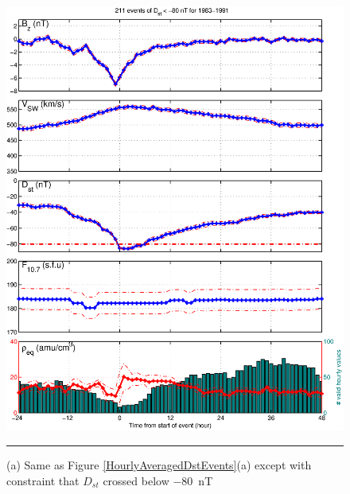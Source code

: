 \documentclass[10pt,twocolumn]{article}
\begin{document}
\begin{figure}[htp!]
\centering
\includegraphics[scale=0.40]{paperfigures/stormavs-d80.eps}
\rule[1ex]{5cm}{1pt}
\caption{(a) Same as Figure \ref{HourlyAveragedDstEvents}(a) except with constraint that $D_{st}$ crossed below $-80$~nT }
\label{Dspec}
\end{figure}

\clearpage
\end{document}
